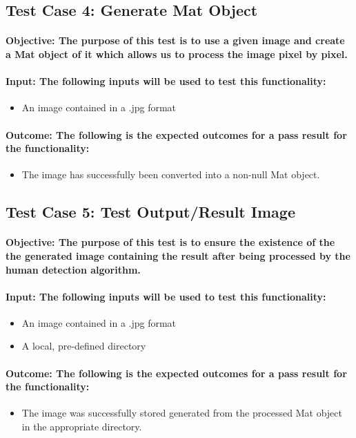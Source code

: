 \documentclass[a4paper,12pt]{report}
\begin{document}
	\subsection{Test Case 4: Generate Mat Object}
	\paragraph{Objective: The purpose of this test is to use a given image and create a Mat object of it which allows us to process the image pixel by pixel.}
	\paragraph{Input: The following inputs will be used to test this functionality:}
	\begin{itemize}
		\item An image contained in a .jpg format
	\end{itemize}
	\paragraph{Outcome: The following is the expected outcomes for a pass result for the functionality:}
	\begin{itemize}
		\item The image has successfully been converted into a non-null Mat object.
	\end{itemize}	
	
	\subsection{Test Case 5: Test Output/Result Image}
	\paragraph{Objective: The purpose of this test is to ensure the existence of the the generated image containing the result after being processed by the human detection algorithm.}
	\paragraph{Input: The following inputs will be used to test this functionality:}
	\begin{itemize}
		\item An image contained in a .jpg format
		\item A local, pre-defined directory
	\end{itemize}
	\paragraph{Outcome: The following is the expected outcomes for a pass result for the functionality:}
	\begin{itemize}
		\item The image was successfully stored generated from the processed Mat object in the appropriate directory.
	\end{itemize}
	
\end{document}
